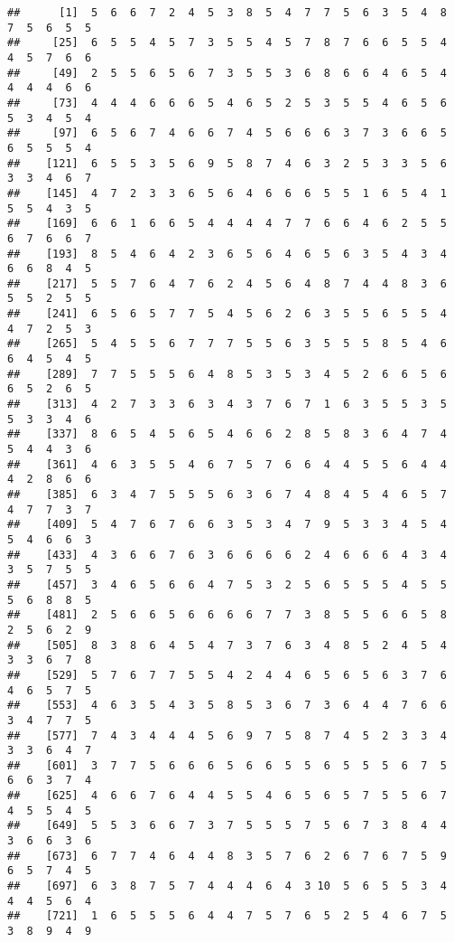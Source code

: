 \documentclass[
]{book}
\begin{document}
\begin{verbatim}
##      [1]  5  6  6  7  2  4  5  3  8  5  4  7  7  5  6  3  5  4  8  7  5  6  5  5
##     [25]  6  5  5  4  5  7  3  5  5  4  5  7  8  7  6  6  5  5  4  4  5  7  6  6
##     [49]  2  5  5  6  5  6  7  3  5  5  3  6  8  6  6  4  6  5  4  4  4  4  6  6
##     [73]  4  4  4  6  6  6  5  4  6  5  2  5  3  5  5  4  6  5  6  5  3  4  5  4
##     [97]  6  5  6  7  4  6  6  7  4  5  6  6  6  3  7  3  6  6  5  6  5  5  5  4
##    [121]  6  5  5  3  5  6  9  5  8  7  4  6  3  2  5  3  3  5  6  3  3  4  6  7
##    [145]  4  7  2  3  3  6  5  6  4  6  6  6  5  5  1  6  5  4  1  5  5  4  3  5
##    [169]  6  6  1  6  6  5  4  4  4  4  7  7  6  6  4  6  2  5  5  6  7  6  6  7
##    [193]  8  5  4  6  4  2  3  6  5  6  4  6  5  6  3  5  4  3  4  6  6  8  4  5
##    [217]  5  5  7  6  4  7  6  2  4  5  6  4  8  7  4  4  8  3  6  5  5  2  5  5
##    [241]  6  5  6  5  7  7  5  4  5  6  2  6  3  5  5  6  5  5  4  4  7  2  5  3
##    [265]  5  4  5  5  6  7  7  7  5  5  6  3  5  5  5  8  5  4  6  6  4  5  4  5
##    [289]  7  7  5  5  5  6  4  8  5  3  5  3  4  5  2  6  6  5  6  6  5  2  6  5
##    [313]  4  2  7  3  3  6  3  4  3  7  6  7  1  6  3  5  5  3  5  5  3  3  4  6
##    [337]  8  6  5  4  5  6  5  4  6  6  2  8  5  8  3  6  4  7  4  5  4  4  3  6
##    [361]  4  6  3  5  5  4  6  7  5  7  6  6  4  4  5  5  6  4  4  4  2  8  6  6
##    [385]  6  3  4  7  5  5  5  6  3  6  7  4  8  4  5  4  6  5  7  4  7  7  3  7
##    [409]  5  4  7  6  7  6  6  3  5  3  4  7  9  5  3  3  4  5  4  5  4  6  6  3
##    [433]  4  3  6  6  7  6  3  6  6  6  6  2  4  6  6  6  4  3  4  3  5  7  5  5
##    [457]  3  4  6  5  6  6  4  7  5  3  2  5  6  5  5  5  4  5  5  5  6  8  8  5
##    [481]  2  5  6  6  5  6  6  6  6  7  7  3  8  5  5  6  6  5  8  2  5  6  2  9
##    [505]  8  3  8  6  4  5  4  7  3  7  6  3  4  8  5  2  4  5  4  3  3  6  7  8
##    [529]  5  7  6  7  7  5  5  4  2  4  4  6  5  6  5  6  3  7  6  4  6  5  7  5
##    [553]  4  6  3  5  4  3  5  8  5  3  6  7  3  6  4  4  7  6  6  3  4  7  7  5
##    [577]  7  4  3  4  4  4  5  6  9  7  5  8  7  4  5  2  3  3  4  3  3  6  4  7
##    [601]  3  7  7  5  6  6  6  5  6  6  5  5  6  5  5  5  6  7  5  6  6  3  7  4
##    [625]  4  6  6  7  6  4  4  5  5  4  6  5  6  5  7  5  5  6  7  4  5  5  4  5
##    [649]  5  5  3  6  6  7  3  7  5  5  5  7  5  6  7  3  8  4  4  3  6  6  3  6
##    [673]  6  7  7  4  6  4  4  8  3  5  7  6  2  6  7  6  7  5  9  6  5  7  4  5
##    [697]  6  3  8  7  5  7  4  4  4  6  4  3 10  5  6  5  5  3  4  4  4  5  6  4
##    [721]  1  6  5  5  5  6  4  4  7  5  7  6  5  2  5  4  6  7  5  3  8  9  4  9

\end{verbatim}
\end{document}
